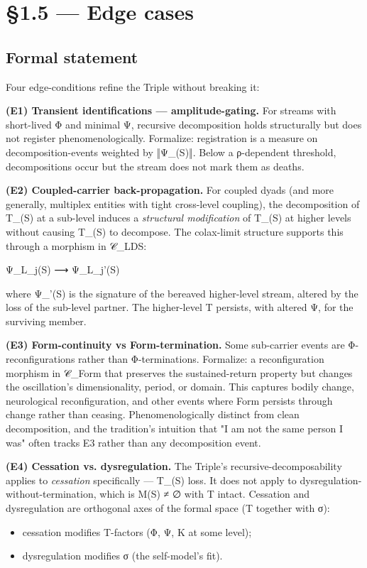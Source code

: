 \documentclass[11pt, openany]{book}
\newcommand{\sectionbreak}{\clearpage}
\begin{document}
\sectionbreak

\section{§1.5 --- Edge cases}

\subsection{Formal statement}

Four edge-conditions refine the Triple without breaking it:

\textbf{(E1) Transient identifications --- amplitude-gating.}
For streams with short-lived Φ and minimal Ψ, recursive decomposition holds structurally but does not register phenomenologically. Formalize: registration is a measure on decomposition-events weighted by ‖Ψ\_(S)‖. Below a ρ-dependent threshold, decompositions occur but the stream does not mark them as deaths.

\textbf{(E2) Coupled-carrier back-propagation.}
For coupled dyads (and more generally, multiplex entities with tight cross-level coupling), the decomposition of T\_(S) at a sub-level induces a \textit{structural modification} of T\_(S) at higher levels without causing T\_(S) to decompose. The colax-limit structure supports this through a morphism in 𝒞\_\allowbreak{}LDS:
\begin{Code}
Ψ_{L_j}(S) ⟶ Ψ_{L_j}'(S)
\end{Code}
where Ψ\_'(S) is the signature of the bereaved higher-level stream, altered by the loss of the sub-level partner. The higher-level T persists, with altered Ψ, for the surviving member.

\textbf{(E3) Form-continuity vs Form-termination.}
Some sub-carrier events are Φ-reconfigurations rather than Φ-terminations. Formalize: a reconfiguration morphism in 𝒞\_\allowbreak{}Form that preserves the sustained-return property but changes the oscillation's dimensionality, period, or domain. This captures bodily change, neurological reconfiguration, and other events where Form persists through change rather than ceasing. Phenomenologically distinct from clean decomposition, and the tradition's intuition that "I am not the same person I was" often tracks E3 rather than any decomposition event.

\textbf{(E4) Cessation vs. dysregulation.}
The Triple's recursive-decomposability applies to \textit{cessation} specifically --- T\_(S) loss. It does not apply to dysregulation-without-termination, which is M(S) ≠ ∅ with T intact. Cessation and dysregulation are orthogonal axes of the formal space (T together with σ):
\begin{itemize}
\item cessation modifies T-factors (Φ, Ψ, Κ at some level);
\item dysregulation modifies σ (the self-model's fit).
\end{itemize}
\end{document}
